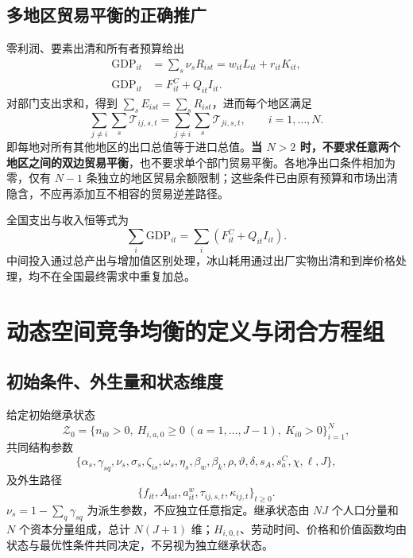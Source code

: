\documentclass[UTF8,a4paper,zihao=-4,fontset=windows]{ctexart}
\numberwithin{equation}{section}
\newcommand{\invp}{Q}
\begin{document}
\subsection{多地区贸易平衡的正确推广}
零利润、要素出清和所有者预算给出
\begin{align}
 \mathrm{GDP}_{it}&=\sum_s\nu_sR_{ist}
 =w_{it}L_{it}+r_{it}K_{it},\label{eq:lg-gdp-income}\\
 \mathrm{GDP}_{it}&=F^C_{it}+\invp_{it}I_{it}.
 \label{eq:lg-gdp-expenditure}
\end{align}
对部门支出求和，得到 $\sum_sE_{ist}=\sum_sR_{ist}$，进而每个地区满足
\begin{equation}
 \sum_{j\neq i}\sum_s\mathcal T_{ij,s,t}
 =\sum_{j\neq i}\sum_s\mathcal T_{ji,s,t},
 \qquad i=1,\ldots,N.
 \label{eq:lg-regional-trade-balance}
\end{equation}
即每地对所有其他地区的出口总值等于进口总值。\textbf{当 $N>2$ 时，不要求任意两个地区之间的双边贸易平衡}，也不要求单个部门贸易平衡。各地净出口条件相加为零，仅有 $N-1$ 条独立的地区贸易余额限制；这些条件已由原有预算和市场出清隐含，不应再添加互不相容的贸易逆差路径。

全国支出与收入恒等式为
\begin{equation}
 \sum_i\mathrm{GDP}_{it}=\sum_i\left(F^C_{it}+\invp_{it}I_{it}\right).
 \label{eq:lg-national-resource}
\end{equation}
中间投入通过总产出与增加值区别处理，冰山耗用通过出厂实物出清和到岸价格处理，均不在全国最终需求中重复加总。

\section{动态空间竞争均衡的定义与闭合方程组}
\label{sec:lg-equilibrium}

\subsection{初始条件、外生量和状态维度}
给定初始继承状态
\begin{equation}
 \mathcal Z_0=\{n_{i0}>0,\ H_{i,a,0}\geq0\ (a=1,\ldots,J-1),\ K_{i0}>0\}_{i=1}^N,
 \label{eq:lg-initial-state}
\end{equation}
共同结构参数
\begin{equation}
 \{\alpha_s,\gamma_{sq},\nu_s,\sigma_s,\zeta_{is},\omega_s,\eta_s,
 \beta_w,\beta_k,\rho,\vartheta,\delta,s_A,s^C_a,\chi,\ell,J\},
\end{equation}
及外生路径
\begin{equation}
 \{f_{it},A_{ist},a^w_{it},\tau_{ij,s,t},\kappa_{ij,t}\}_{t\geq0}.
 \label{eq:lg-exogenous-path}
\end{equation}
$\nu_s=1-\sum_q\gamma_{sq}$ 为派生参数，不应独立任意指定。继承状态由 $NJ$ 个人口分量和 $N$ 个资本分量组成，总计 $N(J+1)$ 维；$H_{i,0,t}$、劳动时间、价格和价值函数均由状态与最优性条件共同决定，不另视为独立继承状态。
\end{document}
